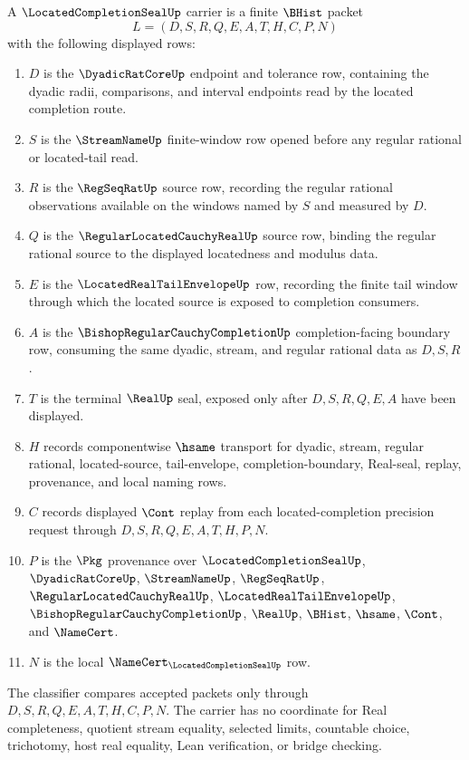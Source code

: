 \begin{definition}
\label{def:located-completion-seal-carrier}
A $\LocatedCompletionSealUp$ carrier is a finite $\BHist$ packet
$$
L=(D,S,R,Q,E,A,T,H,C,P,N)
$$
with the following displayed rows:
\begin{enumerate}
\item $D$ is the $\DyadicRatCoreUp$ endpoint and tolerance row, containing the dyadic radii, comparisons, and interval endpoints read by the located completion route.
\item $S$ is the $\StreamNameUp$ finite-window row opened before any regular rational or located-tail read.
\item $R$ is the $\RegSeqRatUp$ source row, recording the regular rational observations available on the windows named by $S$ and measured by $D$.
\item $Q$ is the $\RegularLocatedCauchyRealUp$ source row, binding the regular rational source to the displayed locatedness and modulus data.
\item $E$ is the $\LocatedRealTailEnvelopeUp$ row, recording the finite tail window through which the located source is exposed to completion consumers.
\item $A$ is the $\BishopRegularCauchyCompletionUp$ completion-facing boundary row, consuming the same dyadic, stream, and regular rational data as $D,S,R$.
\item $T$ is the terminal $\RealUp$ seal, exposed only after $D,S,R,Q,E,A$ have been displayed.
\item $H$ records componentwise $\hsame$ transport for dyadic, stream, regular rational, located-source, tail-envelope, completion-boundary, Real-seal, replay, provenance, and local naming rows.
\item $C$ records displayed $\Cont$ replay from each located-completion precision request through $D,S,R,Q,E,A,T,H,P,N$.
\item $P$ is the $\Pkg$ provenance over $\LocatedCompletionSealUp$, $\DyadicRatCoreUp$, $\StreamNameUp$, $\RegSeqRatUp$, $\RegularLocatedCauchyRealUp$, $\LocatedRealTailEnvelopeUp$, $\BishopRegularCauchyCompletionUp$, $\RealUp$, $\BHist$, $\hsame$, $\Cont$, and $\NameCert$.
\item $N$ is the local $\NameCert_{\LocatedCompletionSealUp}$ row.
\end{enumerate}
The classifier compares accepted packets only through $D,S,R,Q,E,A,T,H,C,P,N$. The carrier has no coordinate for Real completeness, quotient stream equality, selected limits, countable choice, trichotomy, host real equality, Lean verification, or bridge checking.
\end{definition}

